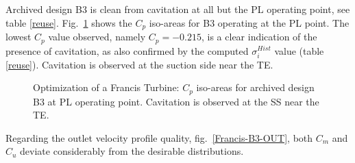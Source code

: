 \FloatBarrier
Archived design B3 is clean from cavitation at all but the PL operating point, see table \ref{reuse}. Fig.\ \ref{Francis-B3-PL} shows the $C_p$ iso-areas for  B3 operating at the PL point. The lowest $C_p$ value observed, namely $C_p= -0.215$, is a clear indication of the presence of cavitation, as also confirmed by the computed $\sigma_i^{Hist}$ value (table \ref{reuse}). Cavitation is observed at the suction side near the TE.     


\begin{figure}[h!]
\begin{minipage}[b]{1\linewidth}
 \centering
\end{minipage}
\caption{Optimization of a Francis Turbine: $C_p$ iso-areas for archived design B3 at PL operating point. Cavitation is observed at the SS near the TE.}
\label{Francis-B3-PL}
\end{figure}

Regarding the outlet velocity profile quality, fig.\ \ref{Francis-B3-OUT}, both $C_m$  and $C_u$ deviate considerably from the desirable distributions.   

